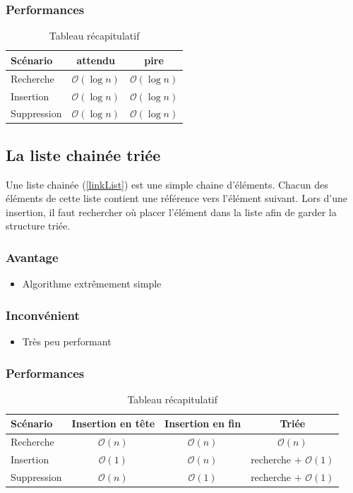 \documentclass[hidelinks,a4paper, 12pt]{article}
\begin{document}
	\subsubsection*{Performances}
	\begin{table}[h]
		\begin{tabular}{|l|c|c|}
			\hline
			Scénario & attendu & pire \\
			\hline
			Recherche & $\mathcal{O}(\log n)$ & $\mathcal{O}(\log n)$ \\ 
			\hline
			Insertion & $\mathcal{O}(\log n)$ & $\mathcal{O}(\log n)$ \\
			\hline
			Suppression & $\mathcal{O}(\log n)$ & $\mathcal{O}(\log n)$\\
			\hline
		\end{tabular}
		\caption{Tableau récapitulatif}
	\end{table}
	
	\subsection{La liste chainée triée}
	Une liste chainée (\cref{linkList}) est une simple chaine d'éléments. Chacun des éléments de cette liste contient une référence vers l'élément suivant. Lors d'une insertion, il faut rechercher où placer l'élément dans la liste afin de garder la structure triée.
	
	
	\subsubsection*{Avantage}
	\begin{itemize}
		\item Algorithme extrêmement simple
	\end{itemize}
	\subsubsection*{Inconvénient}
	\begin{itemize}
		\item Très peu performant
	\end{itemize}
	\subsubsection*{Performances}
	\begin{table}[h]
		\begin{tabular}{|l|c|c|c|}
			\hline
			Scénario & Insertion en tête & Insertion en fin & Triée \\
			\hline
			Recherche & $\mathcal{O}(n)$ & $\mathcal{O}(n)$ & $\mathcal{O}(n)$ \\ 
			\hline
			Insertion & $\mathcal{O}(1)$ & $\mathcal{O}(n)$ & recherche +  $\mathcal{O}(1)$ \\
			\hline
			Suppression & $\mathcal{O}(n)$ & $\mathcal{O}(1)$ & recherche + $\mathcal{O}(1)$ \\
			\hline
		\end{tabular}
		\caption{Tableau récapitulatif}
	\end{table}
	
\end{document}
